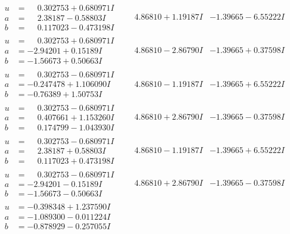 \documentclass[1p]{elsarticle_modified}
\theoremstyle{definition}
\begin{document}
$$\begin{array}{c|c|c}
\begin{aligned}
u &= \phantom{-}0.302753 + 0.680971 I \\
a &= \phantom{-}2.38187 - 0.58803 I \\
b &= \phantom{-}0.117023 - 0.473198 I\end{aligned}
 & \phantom{-}4.86810 + 1.19187 I & -1.39665 - 6.55222 I \\ \hline\begin{aligned}
u &= \phantom{-}0.302753 + 0.680971 I \\
a &= -2.94201 + 0.15189 I \\
b &= -1.56673 + 0.50663 I\end{aligned}
 & \phantom{-}4.86810 - 2.86790 I & -1.39665 + 0.37598 I \\ \hline\begin{aligned}
u &= \phantom{-}0.302753 - 0.680971 I \\
a &= -0.247478 + 1.106090 I \\
b &= -0.76389 + 1.50753 I\end{aligned}
 & \phantom{-}4.86810 - 1.19187 I & -1.39665 + 6.55222 I \\ \hline\begin{aligned}
u &= \phantom{-}0.302753 - 0.680971 I \\
a &= \phantom{-}0.407661 + 1.153260 I \\
b &= \phantom{-}0.174799 - 1.043930 I\end{aligned}
 & \phantom{-}4.86810 + 2.86790 I & -1.39665 - 0.37598 I \\ \hline\begin{aligned}
u &= \phantom{-}0.302753 - 0.680971 I \\
a &= \phantom{-}2.38187 + 0.58803 I \\
b &= \phantom{-}0.117023 + 0.473198 I\end{aligned}
 & \phantom{-}4.86810 - 1.19187 I & -1.39665 + 6.55222 I \\ \hline\begin{aligned}
u &= \phantom{-}0.302753 - 0.680971 I \\
a &= -2.94201 - 0.15189 I \\
b &= -1.56673 - 0.50663 I\end{aligned}
 & \phantom{-}4.86810 + 2.86790 I & -1.39665 - 0.37598 I \\ \hline\begin{aligned}
u &= -0.398348 + 1.237590 I \\
a &= -1.089300 - 0.011224 I \\
b &= -0.878929 - 0.257055 I\end{aligned}

\end{array}$$
\end{document}
